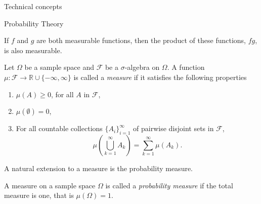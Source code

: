 \begin{section}{Technical concepts \label{sec:tc}}
\begin{subsection}{Probability Theory}
\begin{theorem}
	\label{thm:measurablefunctionproduct}
	If $f$ and $g$ are both measurable functions, then the product of these functions, $fg$, is also measurable.
\end{theorem}
	\begin{definition}
		Let $\Omega$ be a sample space and $\mathcal{F}$ be a $\sigma$-algebra on $\Omega$. A function $\mu: \mathcal{F} \to \mathbb{R} \cup \{-\infty,\infty\}$ is called a \emph{measure} if it satisfies the following properties 
			\begin{enumerate}
			\item $\mu(A) \geq 0$, for all $A$ in $\mathcal{F}$, 
			\item $\mu(\emptyset) = 0$,
			\item For all countable collections $\{A_i\}_{i=1}^\infty$ of pairwise disjoint sets in $\mathcal{F}$,
			\begin{equation*}
			\mu \left(\bigcup_{k=1}^\infty A_k \right)  = \sum_{k=1}^\infty \mu(A_k).
			\end{equation*}
		\end{enumerate}
	\end{definition}
	A natural extension to a measure is the probability measure.
	\begin{definition}
		A measure on a sample space $\Omega$ is called a \emph{probability measure} if the total measure is one, that is $\mu(\Omega) = 1$.
	\end{definition}
	\iffalse
	\begin{definition}[Probability measure]
		A \emph{probability measure} $\P$ on a measurable space $(\Omega, \mathcal{F})$ is a function $\P:\mathcal{F}\to [0,1]$ such that
		\begin{enumerate}
			\item $\P(\Omega) = 1$.
			\item For every infinite sequence $A_1,A_2,\dots \in \mathcal{F}$,
			\[\P\left(\bigcup_i A_i \right) \leq \sum_i \P(A_i). \]
			\item For every mutually exclusive infinite sequence $A_1,A_2,\dots \in \mathcal{F}$,
			\[\P\left(\bigcup_i A_i \right) = \sum_i \P(A_i). \]
		\end{enumerate}
	\end{definition}
	\begin{definition}[Probability space]
		A \emph{probability space} is a triplet $(\Omega,\mathcal{F},\P)$, where $\Omega$ is a sample space $\mathcal{F}$ is a $\sigma$-field on $\Omega$, and $\P:\mathcal{F}\to [0,1]$ is a probability measure on $(\Omega,\mathcal{F})$.
	\end{definition}
\begin{definition}
	An \emph{event} $A \in \mathcal{F}$, has a probability $\P(A)$ of occurring. We say the event happens \emph{almost surely} (a.s.) if $\P(A) = 1$.
\end{definition}
\fi



\end{subsection}
\end{section}
